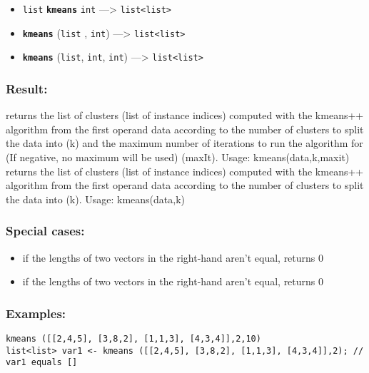 \documentclass[]{book}
\providecommand{\tightlist}{%
  \setlength{\itemsep}{0pt}\setlength{\parskip}{0pt}}
\theoremstyle{definition}
\theoremstyle{definition}
\theoremstyle{definition}
\theoremstyle{remark}
\begin{document}
\begin{itemize}
\tightlist
\item
  \texttt{list} \textbf{\texttt{kmeans}} \texttt{int} ---\textgreater{}
  \texttt{list\textless{}list\textgreater{}}
\item
  \textbf{\texttt{kmeans}} (\texttt{list} , \texttt{int})
  ---\textgreater{} \texttt{list\textless{}list\textgreater{}}
\item
  \textbf{\texttt{kmeans}} (\texttt{list}, \texttt{int}, \texttt{int})
  ---\textgreater{} \texttt{list\textless{}list\textgreater{}}
\end{itemize}

\subsubsection{Result:}\label{result-303}

returns the list of clusters (list of instance indices) computed with
the kmeans++ algorithm from the first operand data according to the
number of clusters to split the data into (k) and the maximum number of
iterations to run the algorithm for (If negative, no maximum will be
used) (maxIt). Usage: kmeans(data,k,maxit) returns the list of clusters
(list of instance indices) computed with the kmeans++ algorithm from the
first operand data according to the number of clusters to split the data
into (k). Usage: kmeans(data,k)

\subsubsection{Special cases:}\label{special-cases-82}

\begin{itemize}
\tightlist
\item
  if the lengths of two vectors in the right-hand aren't equal, returns
  0\\
\item
  if the lengths of two vectors in the right-hand aren't equal, returns
  0
\end{itemize}

\subsubsection{Examples:}\label{examples-220}

\begin{verbatim}
kmeans ([[2,4,5], [3,8,2], [1,1,3], [4,3,4]],2,10)  
list<list> var1 <- kmeans ([[2,4,5], [3,8,2], [1,1,3], [4,3,4]],2); // var1 equals []
\end{verbatim}
\end{document}
